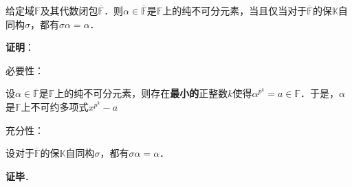 \begin{theorem}{}
给定域$\mathbb{F}$及其代数闭包$\overline{\mathbb{F}}$．则$\alpha\in\overline{\mathbb{F}}$是$\mathbb{F}$上的纯不可分元素，当且仅当对于$\overline{\mathbb{F}}$的保$\mathbb{K}$自同构$\sigma$，都有$\sigma\alpha=\alpha$．
\end{theorem}

\textbf{证明}：

必要性：

设$\alpha\in\overline{\mathbb{F}}$是$\mathbb{F}$上的纯不可分元素，则存在\textbf{最小的}正整数$k$使得$\alpha^{p^k}=a\in\mathbb{F}$．于是，$\alpha$是$\mathbb{F}$上不可约多项式$x^{p^k}-a$







充分性：

设对于$\overline{\mathbb{F}}$的保$\mathbb{K}$自同构$\sigma$，都有$\sigma\alpha=\alpha$．

\textbf{证毕}．










